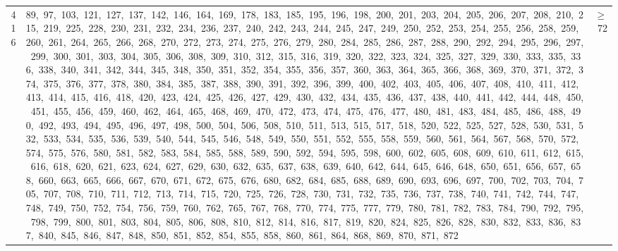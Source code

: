 \begin{longtable}{c|p{}|r}
416 & 89,\ 97,\ 103,\ 121,\ 127,\ 137,\ 142,\ 146,\ 164,\ 169,\ 178,\ 183,\ 185,\ 195,\ 196,\ 198,\ 200,\ 201,\ 203,\ 204,\ 205,\ 206,\ 207,\ 208,\ 210,\ 215,\ 219,\ 225,\ 228,\ 230,\ 231,\ 232,\ 234,\ 236,\ 237,\ 240,\ 242,\ 243,\ 244,\ 245,\ 247,\ 249,\ 250,\ 252,\ 253,\ 254,\ 255,\ 256,\ 258,\ 259,\ 260,\ 261,\ 264,\ 265,\ 266,\ 268,\ 270,\ 272,\ 273,\ 274,\ 275,\ 276,\ 279,\ 280,\ 284,\ 285,\ 286,\ 287,\ 288,\ 290,\ 292,\ 294,\ 295,\ 296,\ 297,\ 299,\ 300,\ 301,\ 303,\ 304,\ 305,\ 306,\ 308,\ 309,\ 310,\ 312,\ 315,\ 316,\ 319,\ 320,\ 322,\ 323,\ 324,\ 325,\ 327,\ 329,\ 330,\ 333,\ 335,\ 336,\ 338,\ 340,\ 341,\ 342,\ 344,\ 345,\ 348,\ 350,\ 351,\ 352,\ 354,\ 355,\ 356,\ 357,\ 360,\ 363,\ 364,\ 365,\ 366,\ 368,\ 369,\ 370,\ 371,\ 372,\ 374,\ 375,\ 376,\ 377,\ 378,\ 380,\ 384,\ 385,\ 387,\ 388,\ 390,\ 391,\ 392,\ 396,\ 399,\ 400,\ 402,\ 403,\ 405,\ 406,\ 407,\ 408,\ 410,\ 411,\ 412,\ 413,\ 414,\ 415,\ 416,\ 418,\ 420,\ 423,\ 424,\ 425,\ 426,\ 427,\ 429,\ 430,\ 432,\ 434,\ 435,\ 436,\ 437,\ 438,\ 440,\ 441,\ 442,\ 444,\ 448,\ 450,\ 451,\ 455,\ 456,\ 459,\ 460,\ 462,\ 464,\ 465,\ 468,\ 469,\ 470,\ 472,\ 473,\ 474,\ 475,\ 476,\ 477,\ 480,\ 481,\ 483,\ 484,\ 485,\ 486,\ 488,\ 490,\ 492,\ 493,\ 494,\ 495,\ 496,\ 497,\ 498,\ 500,\ 504,\ 506,\ 508,\ 510,\ 511,\ 513,\ 515,\ 517,\ 518,\ 520,\ 522,\ 525,\ 527,\ 528,\ 530,\ 531,\ 532,\ 533,\ 534,\ 535,\ 536,\ 539,\ 540,\ 544,\ 545,\ 546,\ 548,\ 549,\ 550,\ 551,\ 552,\ 555,\ 558,\ 559,\ 560,\ 561,\ 564,\ 567,\ 568,\ 570,\ 572,\ 574,\ 575,\ 576,\ 580,\ 581,\ 582,\ 583,\ 584,\ 585,\ 588,\ 589,\ 590,\ 592,\ 594,\ 595,\ 598,\ 600,\ 602,\ 605,\ 608,\ 609,\ 610,\ 611,\ 612,\ 615,\ 616,\ 618,\ 620,\ 621,\ 623,\ 624,\ 627,\ 629,\ 630,\ 632,\ 635,\ 637,\ 638,\ 639,\ 640,\ 642,\ 644,\ 645,\ 646,\ 648,\ 650,\ 651,\ 656,\ 657,\ 658,\ 660,\ 663,\ 665,\ 666,\ 667,\ 670,\ 671,\ 672,\ 675,\ 676,\ 680,\ 682,\ 684,\ 685,\ 688,\ 689,\ 690,\ 693,\ 696,\ 697,\ 700,\ 702,\ 703,\ 704,\ 705,\ 707,\ 708,\ 710,\ 711,\ 712,\ 713,\ 714,\ 715,\ 720,\ 725,\ 726,\ 728,\ 730,\ 731,\ 732,\ 735,\ 736,\ 737,\ 738,\ 740,\ 741,\ 742,\ 744,\ 747,\ 748,\ 749,\ 750,\ 752,\ 754,\ 756,\ 759,\ 760,\ 762,\ 765,\ 767,\ 768,\ 770,\ 774,\ 775,\ 777,\ 779,\ 780,\ 781,\ 782,\ 783,\ 784,\ 790,\ 792,\ 795,\ 798,\ 799,\ 800,\ 801,\ 803,\ 804,\ 805,\ 806,\ 808,\ 810,\ 812,\ 814,\ 816,\ 817,\ 819,\ 820,\ 824,\ 825,\ 826,\ 828,\ 830,\ 832,\ 833,\ 836,\ 837,\ 840,\ 845,\ 846,\ 847,\ 848,\ 850,\ 851,\ 852,\ 854,\ 855,\ 858,\ 860,\ 861,\ 864,\ 868,\ 869,\ 870,\ 871,\ 872 & $\ge$ 72 \\

\end{longtable}
